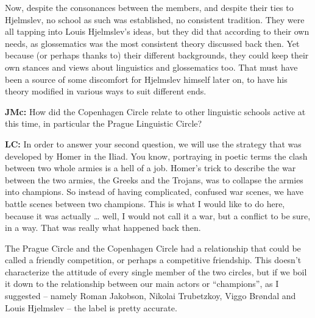 \begin{styleStandard}
Now, despite the consonances between the members, and despite their ties to Hjelmslev, no school as such was established, no consistent tradition. They were all tapping into Louis Hjelmslev’s ideas, but they did that according to their own needs, as glossematics was the most consistent theory discussed back then. Yet because (or perhaps thanks to) their different backgrounds, they could keep their own stances and views about linguistics and glossematics too. That must have been a source of some discomfort for Hjelmslev himself later on, to have his theory modified in various ways to suit different ends.
\end{styleStandard}

\begin{styleStandard}
\textbf{JMc:} How did the Copenhagen Circle relate to other linguistic schools active at this time, in particular the Prague Linguistic Circle?
\end{styleStandard}

\begin{styleStandard}
\textbf{LC:} In order to answer your second question, we will use the strategy that was developed by Homer in the Iliad. You know, portraying in poetic terms the clash between two whole armies is a hell of a job. Homer’s trick to describe the war between the two armies, the Greeks and the Trojans, was to collapse the armies into champions. So instead of having complicated, confused war scenes, we have battle scenes between two champions. This is what I would like to do here, because it was actually … well, I would not call it a war, but a conflict to be sure, in a way. That was really what happened back then. 
\end{styleStandard}

\begin{styleStandard}
The Prague Circle and the Copenhagen Circle had a relationship that could be called a friendly competition, or perhaps a competitive friendship. This doesn’t characterize the attitude of every single member of the two circles, but if we boil it down to the relationship between our main actors or “champions”, as I suggested – namely Roman Jakobson, Nikolai Trubetzkoy, Viggo Brøndal and Louis Hjelmslev – the label is pretty accurate. 
\end{styleStandard}

